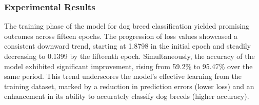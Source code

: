 \subsubsection{Experimental Results}
The training phase of the model for dog breed classification yielded promising outcomes across fifteen epochs. The progression of loss values showcased a consistent downward trend, starting at 1.8798 in the initial epoch and steadily decreasing to 0.1399 by the fifteenth epoch. Simultaneously, the accuracy of the model exhibited significant improvement, rising from 59.2\% to 95.47\% over the same period. This trend underscores the model's effective learning from the training dataset, marked by a reduction in prediction errors (lower loss) and an enhancement in its ability to accurately classify dog breeds (higher accuracy). 
\vspace{1cm}
